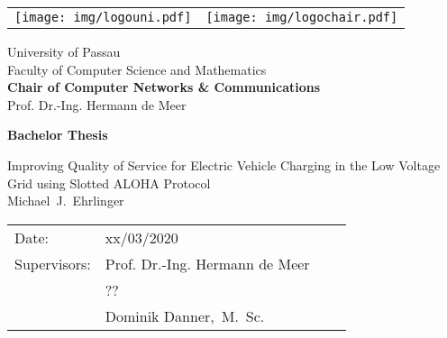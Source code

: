 \documentclass[fontsize=12pt,openright,twoside,paper=a4,BCOR=1cm]{scrbook}
\newcommand{\authornamefirst}{Michael}
\newcommand{\authornamemiddle}{J.}
\newcommand{\authornamelast}{Ehrlinger}
\newcommand{\worktitle}{Improving Quality of Service for Electric Vehicle Charging in the Low Voltage Grid using Slotted ALOHA Protocol}
\newcommand{\thesistype}{Bachelor Thesis}
\newcommand{\thesisdate}{xx/03/2020}
\newcommand{\thesisprof}{Prof. Dr.-Ing. Hermann de Meer}
\newcommand{\thesissecondprof}{??}
\newcommand{\supervisor}{Dominik Danner,~M.~Sc.}
\newcommand{\chair}{Chair of Computer Networks \& Communications}
\begin{document}
\thispagestyle{empty}
\newpage

\vspace{1cm}

\begin{center}
\begin{tabular}{lr}
\texttt{[image: img/logouni.pdf]}
&
\texttt{[image: img/logochair.pdf]}
\end{tabular}

\vspace{3cm}
\Large University of Passau
\\
\Large Faculty of Computer Science and Mathematics
\\
\vspace{0.3cm}
\Large {\bf \chair }
\\
\Large \thesisprof

\end{center}


\vspace{4.5cm}

\begin{center}
        {\bf\Huge \thesistype} %
\end{center}

\begin{center}
        \settowidth{\baselineskip}{0.4cm}
        {\LARGE \worktitle}
        \\
        {\Large
        \authornamefirst~\authornamemiddle~\authornamelast
        }
\end{center}

\vfill {%

\vfill


{\large
\begin{tabular}[l]{llll}

Date:       & \thesisdate %
\smallskip \\
Supervisors:   & \thesisprof \\
&\thesissecondprof \\
	& \supervisor \\
\end{tabular}}
} \cleardoublepage

\let\cleardoublepage\clearpage


%
%
\tableofcontents
\end{document}
